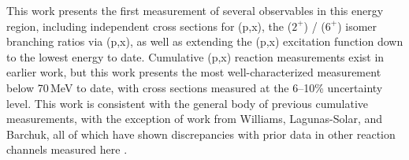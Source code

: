 This work presents the first measurement of several observables in this energy region, including independent cross sections for      (p,x),   the   ($2^+$) /   ($6^+$)   isomer branching ratios via (p,x),  as well as extending the (p,x) excitation function down to the lowest energy to date. 
Cumulative  (p,x) reaction measurements exist in earlier work, but  this work presents the most well-characterized measurement  below 70\,MeV to date, with cross sections measured  at the 6--10\% uncertainty level.
This work is consistent with the general body of previous cumulative  measurements, with the exception of work from Williams, Lagunas-Solar, and Barchuk, all of which have shown discrepancies with prior data in other reaction channels measured here \cite{barchuk1987excitation,Lagunas-Solar1979a,PhysRev.162.1055}.


